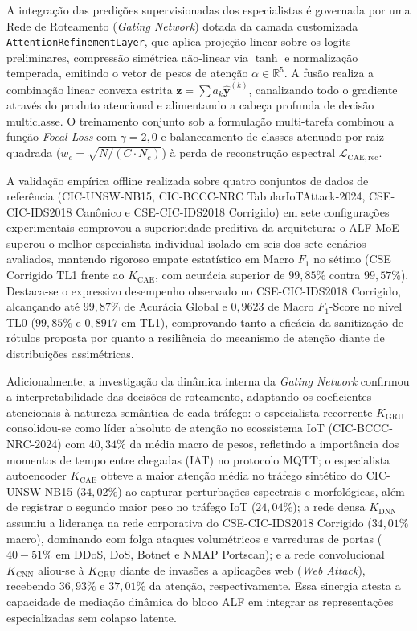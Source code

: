 A integração das predições supervisionadas dos especialistas é governada por uma Rede de Roteamento (\emph{Gating Network}) dotada da camada customizada \texttt{AttentionRefinementLayer}, que aplica projeção linear sobre os logits preliminares, compressão simétrica não-linear via $\tanh$ e normalização temperada, emitindo o vetor de pesos de atenção $\alpha \in \mathbb{R}^5$. A fusão realiza a combinação linear convexa estrita $\mathbf{z} = \sum a_k \hat{\mathbf{y}}^{(k)}$, canalizando todo o gradiente através do produto atencional e alimentando a cabeça profunda de decisão multiclasse. O treinamento conjunto sob a formulação multi-tarefa combinou a função \emph{Focal Loss} com $\gamma = 2{,}0$ e balanceamento de classes atenuado por raiz quadrada ($w_c = \sqrt{N / (C \cdot N_c)}$) à perda de reconstrução espectral $\mathcal{L}_{\mathrm{CAE,rec}}$.

A validação empírica offline realizada sobre quatro conjuntos de dados de referência (CIC-UNSW-NB15, CIC-BCCC-NRC 
TabularIoTAttack-2024, CSE-CIC-IDS2018 Canônico e CSE-CIC-IDS2018 Corrigido) em sete configurações experimentais 
comprovou a superioridade preditiva da arquitetura: o ALF-MoE superou o melhor especialista individual isolado em seis 
dos sete cenários avaliados, mantendo rigoroso empate estatístico em Macro $F_1$ no sétimo (CSE Corrigido TL1 frente ao 
$K_{\mathrm{CAE}}$, com acurácia superior de $99{,}85\%$ contra $99{,}57\%$). Destaca-se o expressivo desempenho 
observado no CSE-CIC-IDS2018 Corrigido, alcançando até $99{,}87\%$ de Acurácia Global e $0{,}9623$ de Macro $F_1$-Score 
no nível TL0 ($99{,}85\%$ e $0{,}8917$ em TL1), comprovando tanto a eficácia da sanitização de rótulos proposta 
por  quanto a resiliência do mecanismo de atenção diante de distribuições assimétricas.

Adicionalmente, a investigação da dinâmica interna da \emph{Gating Network} confirmou a interpretabilidade das decisões de roteamento, adaptando os coeficientes atencionais à natureza semântica de cada tráfego: o especialista recorrente $K_{\mathrm{GRU}}$ consolidou-se como líder absoluto de atenção no ecossistema IoT (CIC-BCCC-NRC-2024) com $40{,}34\%$ da média macro de pesos, refletindo a importância dos momentos de tempo entre chegadas (IAT) no protocolo MQTT; o especialista autoencoder $K_{\mathrm{CAE}}$ obteve a maior atenção média no tráfego sintético do CIC-UNSW-NB15 ($34{,}02\%$) ao capturar perturbações espectrais e morfológicas, além de registrar o segundo maior peso no tráfego IoT ($24{,}04\%$); a rede densa $K_{\mathrm{DNN}}$ assumiu a liderança na rede corporativa do CSE-CIC-IDS2018 Corrigido ($34{,}01\%$ macro), dominando com folga ataques volumétricos e varreduras de portas ($40-51\%$ em DDoS, DoS, Botnet e NMAP Portscan); e a rede convolucional $K_{\mathrm{CNN}}$ aliou-se à $K_{\mathrm{GRU}}$ diante de invasões a aplicações web (\emph{Web Attack}), recebendo $36{,}93\%$ e $37{,}01\%$ da atenção, respectivamente. Essa sinergia atesta a capacidade de mediação dinâmica do bloco ALF em integrar as representações especializadas sem colapso latente.


